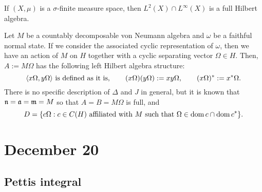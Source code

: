 \documentclass{../../small}
\begin{document}
\begin{ex}
If $(X,\mu)$ is a $\sigma$-finite measure space, then $L^2(X)\cap L^\infty(X)$ is a full Hilbert algebra.
\end{ex}


\begin{ex}
Let $M$ be a countably decomposable von Neumann algebra and $\omega$ be a faithful normal state.
If we consider the associated cyclic representation of $\omega$, then we have an action of $M$ on $H$ together with a cyclic separating vector $\Omega\in H$.
Then, $A:=M\Omega$ has the following left Hilbert algebra structure:
\[\langle x\Omega,y\Omega\rangle\text{ is defined as it is},\qquad (x\Omega)(y\Omega):=xy\Omega,\qquad (x\Omega)^*:=x^*\Omega.\]
There is no specific description of $\Delta$ and $J$ in general, but it is known that $\mathfrak{n}=\mathfrak{a}=\mathfrak{m}=M$ so that $A=B=M\Omega$ is full, and
\[D=\{c\Omega:c\in C(H)\text{ affiliated with $M$ such that }\Omega\in\operatorname{dom} c\cap\operatorname{dom} c^*\}.\]
\end{ex}










\newpage
\section{December 20}

\subsection{Pettis integral}
\end{document}
